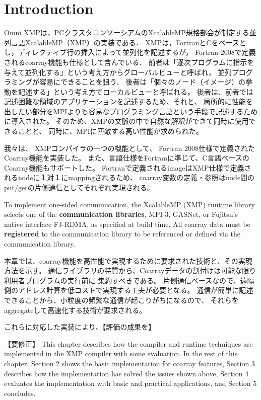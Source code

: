 \section{Introduction}\label{chap:intro}

\setcounter{page}{1}

Omni XMPは，PCクラスタコンソーシアムのXcalableMP規格部会が制定する並列言語XcalableMP（XMP）の実装である．
XMPは，FortranとCをベースとし，ディレクティブ行の挿入によって並列化を記述するが，
Fortran 2008で定義されるcoarray機能も仕様として含んでいる．
前者は「逐次プログラムに指示を与えて並列化する」という考え方からグローバルビューと呼ばれ，
並列プログラミングが容易にできることを狙う．
後者は「個々のノード（イメージ）の挙動を記述する」という考え方でローカルビューと呼ばれる。
後者は、前者では記述困難な領域のアプリケーションを記述するため、それと、
局所的に性能を出したい部分をMPIよりも容易なプログラミング言語という手段で記述するために導入された。
そのため、XMPの文脈の中で自然な解釈ができて同時に使用できることと、
同時に、MPIに匹敵する高い性能が求められた。

我々は、
XMPコンパイラの一つの機能として、
Fortran 2008仕様で定義されたCoarray機能を実装した。
また、言語仕様をFortranに準じて、C言語ベースのCoarray機能もサポートした。
Fortranで定義されるimageはXMP仕様で定義されるnodeに１対１にmappingされるため、
coarray変数の定義・参照はnode間のput/getの片側通信としてそれぞれ実現される。

To implement one-sided communication, the XcalableMP (XMP) runtime library selects 
one of the {\bf communication libraries}, MPI-3, GASNet, or Fujitsu's native 
interface FJ-RDMA, as specified at build time. 
All coarray data must be {\bf registered} to the communication 
library to be referenced or defined via the communication library.

本章では、coarray機能を高性能で実現するために要求された技術と、その実現方法を示す。
通信ライブラリの特質から、Coarrayデータの割付けは可能な限り利用者プログラムの実行前に
集約すべきである。
片側通信ベースなので、遠隔側のアドレス計算を低コストで実現する工夫が必要となる。
通信が簡単に記述できることから、小粒度の頻繁な通信が起こりがちになるので、
それらをaggregateして高速化する技術が要求される。

これらに対応した実装により、【評価の成果を】


【要修正】
This chapter describes how the compiler and runtime techniques are 
implemented in the XMP compiler with some evaluation. 
In the rest of this chapter, 
Section 2 shows the basic implementation for coarray features, 
Section 3 describes how the implementation has solved the issues shown above, 
Section 4 evaluates the implementation with basic and practical applications, and 
Section 5 concludes.

